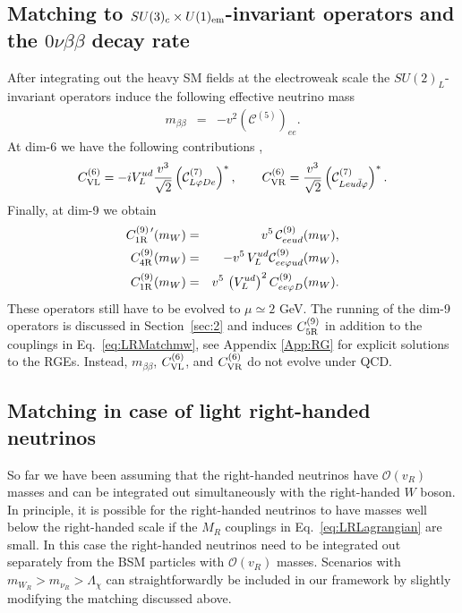 \documentclass[letterpaper,11pt]{article}
\newcommand{\bt}{\beta}
\newcommand{\bea}{\begin{eqnarray}}
\newcommand{\eea}{\end{eqnarray}}
\newcommand{\Or}{\mathcal O}
\newcommand{\vp}{\varphi}
\newcommand{\sq}{^{2}}
\newcommand{\nn}{\nonumber}
\begin{document}
 \subsection{Matching to $SU(3)_c \times U(1)_{\rm em}$-invariant operators and the $0\nu\beta\beta$ decay rate}
After integrating out the heavy SM fields at the electroweak scale the $SU(2)_L$-invariant operators induce the following effective neutrino mass
\bea \label{eq:LRmatchmw5}
m_{\bt\bt}& =&-v^2 \left(\mathcal  C^{(5)}\right)_{ee}.
\eea
At dim-6 we have the following contributions \cite{Cirigliano:2017djv},
\bea\label{eq:LRmatchmw7}
C_{\rm VL}^{(6)}=-iV_L^{ud }\frac{v^3}{\sqrt{2}} \left(\mathcal C^{(7)}_{L\vp De}\right)^* ,\qquad C_{\rm VR}^{(6)}=\frac{v^3}{\sqrt{2}} \left(\mathcal C^{(7)}_{Leu\bar d \vp}\right)^*  .
\eea
Finally, at dim-9 we obtain
\bea
\label{eq:LRMatchmw}
C_{\rm 1R}^{(9)\,\prime}(m_W) &=& v^5\,\mathcal C_{eeud}^{(9)}(m_W),
\nn \\
 C_{\rm 4R}^{(9)}(m_W) &=& -v^5\,V_L^{ud}\mathcal C_{ee\varphi u d}^{(9)}(m_W),
 \nn \\
C_{\rm 1R}^{(9)}(m_W) &=&  v^5\,\left(V_L^{ud}\right)\sq C_{ee\varphi D}^{(9)}(m_W).
\eea
These operators still have to be evolved to $\mu\simeq 2$ GeV. The running of the dim-9 operators is discussed in Section\ \ref{sec:2} and induces $C_{\rm 5R}^{(9)}$ in addition to the couplings in Eq.\ \eqref{eq:LRMatchmw}, see Appendix \ref{App:RG} for explicit solutions to the RGEs. Instead, $m_{\bt\bt}$, $C_{\rm VL}^{(6)}$, and $C_{\rm VR}^{(6)}$ do not evolve under QCD. 

\subsection{Matching in case of light right-handed neutrinos}\label{LR-lightNuR}
So far we have been assuming that the right-handed neutrinos have $\Or(v_R)$ masses  and can be integrated out simultaneously with the right-handed $W$ boson. In principle, it is possible for the right-handed neutrinos to have masses well below the right-handed scale if the $M_R$ couplings in Eq.\ \eqref{eq:LRLagrangian} are small. In this case the right-handed neutrinos need to be integrated out separately from the BSM particles with $\Or(v_R)$ masses. Scenarios with  $m_{W_R}>m_{\nu_R}>\Lambda_\chi$ can straightforwardly be included in our framework by slightly modifying the matching discussed above.
\end{document}
